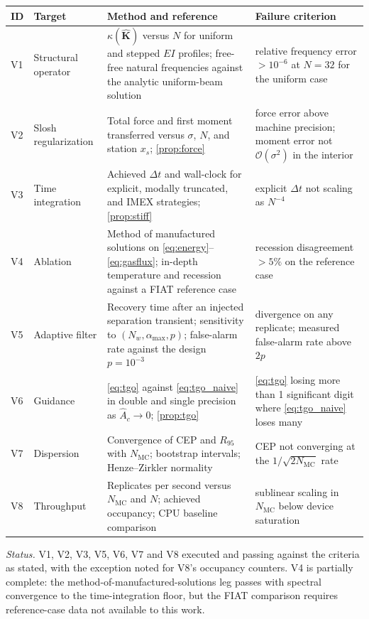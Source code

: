\documentclass[11pt,a4paper]{article}
\theoremstyle{definition}
\numberwithin{equation}{section}
\begin{document}
\begin{center}
\begin{longtable}{@{}llp{5.6cm}p{3.4cm}@{}}
\toprule
\textbf{ID} & \textbf{Target} & \textbf{Method and reference} & \textbf{Failure criterion} \\
\midrule
\endhead
V1 & Structural operator & $\kappa(\hat{\mathbf{K}})$ versus $N$ for uniform and stepped $EI$ profiles; free-free natural frequencies against the analytic uniform-beam solution & relative frequency error $> 10^{-6}$ at $N=32$ for the uniform case \\
\addlinespace
V2 & Slosh regularization & Total force and first moment transferred versus $\sigma$, $N$, and station $x_s$; \cref{prop:force} & force error above machine precision; moment error not $\mathcal{O}(\sigma^2)$ in the interior \\
\addlinespace
V3 & Time integration & Achieved $\Delta t$ and wall-clock for explicit, modally truncated, and IMEX strategies; \cref{prop:stiff} & explicit $\Delta t$ not scaling as $N^{-4}$ \\
\addlinespace
V4 & Ablation & Method of manufactured solutions on \cref{eq:energy}--\cref{eq:gasflux}; in-depth temperature and recession against a FIAT \cite{chen1999} reference case & recession disagreement $> 5\%$ on the reference case \\
\addlinespace
V5 & Adaptive filter & Recovery time after an injected separation transient; sensitivity to $(N_w, \alpha_{\max}, p)$; false-alarm rate against the design $p = 10^{-3}$ & divergence on any replicate; measured false-alarm rate above $2p$ \\
\addlinespace
V6 & Guidance & \cref{eq:tgo} against \cref{eq:tgo_naive} in double and single precision as $\hat{A}_c \to 0$; \cref{prop:tgo} & \cref{eq:tgo} losing more than 1 significant digit where \cref{eq:tgo_naive} loses many \\
\addlinespace
V7 & Dispersion & Convergence of CEP and $R_{95}$ with $N_{\text{MC}}$; bootstrap intervals; Henze--Zirkler normality & CEP not converging at the $1/\sqrt{2N_{\text{MC}}}$ rate \\
\addlinespace
V8 & Throughput & Replicates per second versus $N_{\text{MC}}$ and $N$; achieved occupancy; CPU baseline comparison & sublinear scaling in $N_{\text{MC}}$ below device saturation \\
\bottomrule
\end{longtable}
\end{center}

\emph{Status.} V1, V2, V3, V5, V6, V7 and V8 executed and passing against the criteria as stated, with the exception noted for V8's occupancy counters. V4 is partially complete: the method-of-manufactured-solutions leg passes with spectral convergence to the time-integration floor, but the FIAT comparison requires reference-case data not available to this work.
\end{document}
